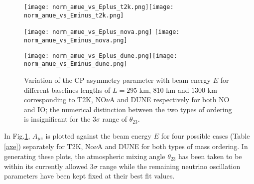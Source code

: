 \documentclass[11pt]{article}
\begin{document}
\begin{figure}[H]
\begin{center}
\texttt{[image: norm\_amue\_vs\_Eplus\_t2k.png]}\texttt{[image: norm\_amue\_vs\_Eminus\_t2k.png]}

\texttt{[image: norm\_amue\_vs\_Eplus\_nova.png]} \texttt{[image: norm\_amue\_vs\_Eminus\_nova.png]}

\texttt{[image: norm\_amue\_vs\_Eplus\_dune.png]}\texttt{[image: norm\_amue\_vs\_Eminus\_dune.png]}




\caption{Variation of the CP asymmetry parameter with beam energy $E$ for different baselines lengths of $L=295$ km, $810$ km and $1300$ km corresponding to T2K, NO$\nu$A and DUNE respectively for both NO and IO; the numerical distinction between the two types of ordering is insignificant for the $3\sigma$ range of $\theta_{23}$.}\label{fig9a}
\end{center}
\end{figure}

In Fig.\ref{fig9a}, $A_{\mu e}$ is plotted against the beam energy $E$ for four possible cases (Table \ref{axe}) separately for T2K, No$\nu$A and DUNE for both types of mass ordering. In generating these plots, the atmospheric mixing angle $\theta_{23}$ has been taken to be within its currently allowed $3\sigma$ range while the remaining neutrino oscillation parameters have  been  kept fixed at their best fit values.
%
%
%
%
\end{document}
